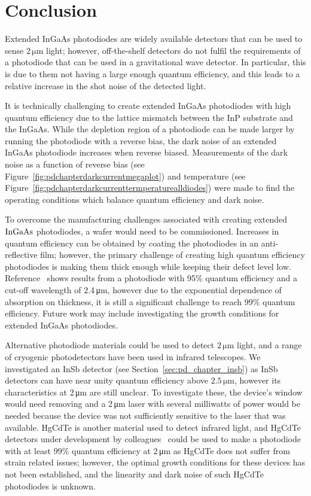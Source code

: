 \section{Conclusion}
Extended InGaAs photodiodes are widely available detectors that can be used to sense $2\,\si{\micro\metre}$ light; however, off-the-shelf detectors do not fulfil the requirements of a photodiode that can be used in a gravitational wave detector. In particular, this is due to them not having a large enough quantum efficiency, and this leads to a relative increase in the shot noise of the detected light.
\par
It is technically challenging to create extended InGaAs photodiodes with high quantum efficiency due to the lattice mismatch between the InP substrate and the InGaAs. While the depletion region of a photodiode can be made larger by running the photodiode with a reverse bias, the dark noise of an extended InGaAs photodiode increases when reverse biased. Measurements of the dark noise as a function of reverse bias (see Figure~\ref{fig:pdchapterdarkcurrentmegaplot}) and temperature (see Figure~\ref{fig:pdchapterdarkcurrenttermperaturealldiodes}) were made to find the operating conditions which balance quantum efficiency and dark noise.
\par
To overcome the manufacturing challenges associated with creating extended $\rm{InGaAs}$ photodiodes, a wafer would need to be commissioned. Increases in quantum efficiency can be obtained by coating the photodiodes in an anti-reflective film; however, the primary challenge of creating high quantum efficiency photodiodes is making them thick enough while keeping their defect level low. Reference~\cite{Moseley1986} shows results from a photodiode with 95\% quantum efficiency and a cut-off wavelength of 2.4\,\si{\micro\meter}, however due to the exponential dependence of absorption on thickness, it is still a significant challenge to reach $99\%$ quantum efficiency. Future work may include investigating the growth conditions for extended InGaAs photodiodes.
\par
Alternative photodiode materials could be used to detect $2\,\si{\micro\meter}$ light, and a range of cryogenic photodetectors have been used in infrared telescopes. We investigated an InSb detector (see Section~\ref{sec:pd_chapter_insb}) as InSb detectors can have near unity quantum efficiency above $2.5\,\si{\micro\meter}$, however its characteristics at 2\,\si{\micro\meter} are still unclear. To investigate these, the device's window would need removing and a 2\,\si{\micro\meter} laser with several milliwatts of power would be needed because the device was not sufficiently sensitive to the laser that was available. HgCdTe is another material used to detect infrared light, and HgCdTe detectors under development by colleagues~\cite{UmanaMembreno2020} could be used to make a photodiode with at least $99\%$ quantum efficiency at 2\,\si{\micro\meter} as HgCdTe does not suffer from strain related issues; however, the optimal growth conditions for these devices has not been established, and the linearity and dark noise of such HgCdTe photodiodes is unknown.  
